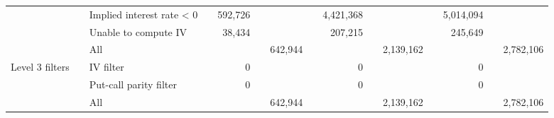 \begin{tabular}{*{4}{l} *{11}{r} }
				  & & Implied interest rate < 0 & &
				592,726 & &  & &
				4,421,368 & &  & &
				5,014,094 & &  \\
			
				  & & Unable to compute IV & &
				38,434 & &  & &
				207,215 & &  & &
				245,649 & &  \\
			
				  & & All & &
				 & & 642,944 & &
				 & & 2,139,162 & &
				 & & 2,782,106 \\
			
				Level 3 filters & & IV filter & &
				0 & &  & &
				0 & &  & &
				0 & &  \\
			
				  & & Put-call parity filter & &
				0 & &  & &
				0 & &  & &
				0 & &  \\
			
				  & & All & &
				 & & 642,944 & &
				 & & 2,139,162 & &
				 & & 2,782,106 \\
			

	        \hline
	    \end{tabular}
	